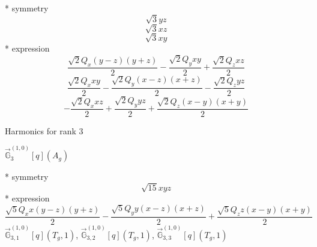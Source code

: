 \documentclass[fleqn,8pt]{jsarticle}
\begin{document}
\noindent\quad ** symmetry
\begin{dmath*}
\sqrt{3} y z
\end{dmath*}
\begin{dmath*}
\sqrt{3} x z
\end{dmath*}
\begin{dmath*}
\sqrt{3} x y
\end{dmath*}
\noindent\quad ** expression
\begin{dmath*}
\frac{\sqrt{2} Q_{x} \left(y - z\right) \left(y + z\right)}{2} - \frac{\sqrt{2} Q_{y} x y}{2} + \frac{\sqrt{2} Q_{z} x z}{2}
\end{dmath*}
\begin{dmath*}
\frac{\sqrt{2} Q_{x} x y}{2} - \frac{\sqrt{2} Q_{y} \left(x - z\right) \left(x + z\right)}{2} - \frac{\sqrt{2} Q_{z} y z}{2}
\end{dmath*}
\begin{dmath*}
- \frac{\sqrt{2} Q_{x} x z}{2} + \frac{\sqrt{2} Q_{y} y z}{2} + \frac{\sqrt{2} Q_{z} \left(x - y\right) \left(x + y\right)}{2}
\end{dmath*}

\noindent * Harmonics for rank 3

\noindent\quad $\vec{\mathbb{G}}_{3}^{(1,0)}[q](A_{g})$

\noindent\quad ** symmetry
\begin{dmath*}
\sqrt{15} x y z
\end{dmath*}
\noindent\quad ** expression
\begin{dmath*}
\frac{\sqrt{5} Q_{x} x \left(y - z\right) \left(y + z\right)}{2} - \frac{\sqrt{5} Q_{y} y \left(x - z\right) \left(x + z\right)}{2} + \frac{\sqrt{5} Q_{z} z \left(x - y\right) \left(x + y\right)}{2}
\end{dmath*}
\noindent\quad $\vec{\mathbb{G}}_{3,1}^{(1,0)}[q](T_{g},1)$, $\vec{\mathbb{G}}_{3,2}^{(1,0)}[q](T_{g},1)$, $\vec{\mathbb{G}}_{3,3}^{(1,0)}[q](T_{g},1)$
\end{document}

